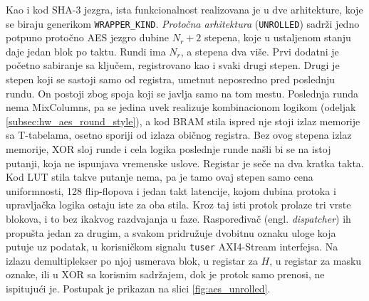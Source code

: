 Kao i kod SHA-3 jezgra, ista funkcionalnost realizovana je u dve arhitekture, koje se biraju generikom \texttt{WRAPPER\_KIND}.
\smallbreak
\textit{Protočna arhitektura} (\texttt{UNROLLED}) sadrži jedno potpuno protočno AES jezgro dubine $N_r + 2$ stepena, koje u ustaljenom stanju daje jedan blok po taktu.
\smallbreak
Rundi ima $N_r$, a stepena dva više. Prvi dodatni je početno sabiranje sa ključem, registrovano kao i svaki drugi stepen. Drugi je stepen koji se sastoji samo od registra, umetnut neposredno pred poslednju rundu. On postoji zbog spoja koji se javlja samo na tom mestu. Poslednja runda nema MixColumns, pa se jedina uvek realizuje kombinacionom logikom (odeljak \ref{subsec:hw_aes_round_style}), a kod BRAM stila ispred nje stoji izlaz memorije sa T-tabelama, osetno sporiji od izlaza običnog registra. Bez ovog stepena izlaz memorije, XOR sloj runde i cela logika poslednje runde našli bi se na istoj putanji, koja ne ispunjava vremenske uslove. Registar je seče na dva kratka takta. Kod LUT stila takve putanje nema, pa je tamo ovaj stepen samo cena uniformnosti, 128 flip-flopova i jedan takt latencije, kojom dubina protoka i upravljačka logika ostaju iste za oba stila.
\smallbreak
Kroz taj isti protok prolaze tri vrste blokova, i to bez ikakvog razdvajanja u faze. Raspoređivač (engl. \textit{dispatcher}) ih propušta jedan za drugim, a svakom pridružuje dvobitnu oznaku uloge koja putuje uz podatak, u korisničkom signalu \texttt{tuser} AXI4-Stream interfejsa. Na izlazu demultiplekser po njoj usmerava blok, u registar za $H$, u registar za masku oznake, ili u XOR sa korisnim sadržajem, dok je protok samo prenosi, ne ispitujući je. Postupak je prikazan na slici \ref{fig:aes_unrolled}.

